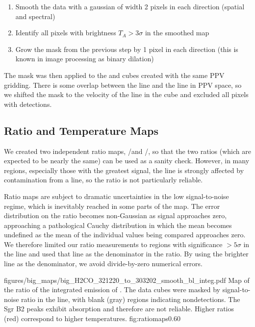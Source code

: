 \begin{enumerate}
    \item Smooth the data with a gaussian of width 2 pixels in each direction
        (spatial and spectral)
    \item Identify all pixels with brightness $T_A > 3\sigma$ in the smoothed
        map
    \item Grow the mask from the previous step by 1 pixel in each direction
        (this is known in image processing as binary dilation)
\end{enumerate}

The \para \threeohthree mask was then applied to the \threetwoone and
\threetwotwo cubes created with the same PPV gridding.  There is some overlap
between the \methanol \fourtwotwo line and the \para \threetwotwo line in PPV
space, so we shifted the \para mask to the velocity of the \methanol line in
the \para \threetwotwo cube and excluded all pixels with \para detections.

\subsection{Ratio and Temperature Maps}
\label{sec:h2co}
We created two independent ratio maps, \threetwotwo/\threeohthree and
\threetwoone/\threeohthree, so that the two ratios (which are expected to be
nearly the same) can be used as a sanity check.  However, in many regions,
especially those with the greatest signal, the \threetwotwo line is strongly
affected by contamination from a \methanol line, so the ratio is not
particularly reliable.

Ratio maps are subject to dramatic uncertainties in the low signal-to-noise
regime, which is inevitably reached in some parts of the map.  The error
distribution on the ratio becomes non-Gaussian as signal approaches zero,
approaching a pathological Cauchy distribution in which the mean becomes
undefined as the mean of the individual values being compared approaches zero.
We therefore limited our ratio measurements to regions with significance
$>5\sigma$ in the \threeohthree line and used that line as the denominator
in the ratio.  By using the brighter line as the denominator, we avoid
divide-by-zero numerical errors.


\Figure
{figures/big_maps/big_H2CO_321220_to_303202_smooth_bl_integ.pdf}
{Map of the ratio of the integrated emission of
\Rone.  The data cubes were masked by
signal-to-noise ratio in the \threeohthree line, with blank (gray) regions
indicating nondetections.  The Sgr B2 peaks exhibit \formaldehyde
absorption and therefore are not reliable.  Higher ratios (red) correspond
to higher temperatures.
}
{fig:ratiomaps}{0.6}{0}

